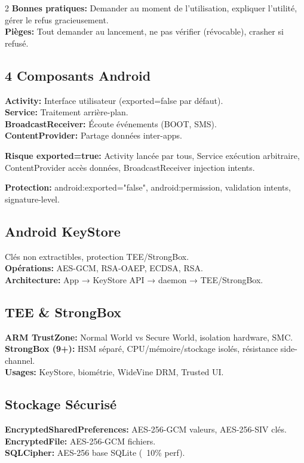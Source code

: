 \documentclass[9pt,a4paper]{extarticle}
\begin{document}
\begin{multicols}{2}
\textbf{Bonnes pratiques:} Demander au moment de l'utilisation, expliquer l'utilité, gérer le refus gracieusement.\\
\textbf{Pièges:} Tout demander au lancement, ne pas vérifier (révocable), crasher si refusé.

\subsection*{4 Composants Android}
\textbf{Activity:} Interface utilisateur (exported=false par défaut).\\
\textbf{Service:} Traitement arrière-plan.\\
\textbf{BroadcastReceiver:} Écoute événements (BOOT, SMS).\\
\textbf{ContentProvider:} Partage données inter-apps.

\textbf{Risque exported=true:} Activity lancée par tous, Service exécution arbitraire, ContentProvider accès données, BroadcastReceiver injection intents.

\textbf{Protection:} android:exported="false", android:permission, validation intents, signature-level.

\subsection*{Android KeyStore}
Clés non extractibles, protection TEE/StrongBox.\\
\textbf{Opérations:} AES-GCM, RSA-OAEP, ECDSA, RSA.\\
\textbf{Architecture:} App → KeyStore API → daemon → TEE/StrongBox.

\subsection*{TEE \& StrongBox}
\textbf{ARM TrustZone:} Normal World vs Secure World, isolation hardware, SMC.\\
\textbf{StrongBox (9+):} HSM séparé, CPU/mémoire/stockage isolés, résistance side-channel.\\
\textbf{Usages:} KeyStore, biométrie, WideVine DRM, Trusted UI.

\subsection*{Stockage Sécurisé}
\textbf{EncryptedSharedPreferences:} AES-256-GCM valeurs, AES-256-SIV clés.\\
\textbf{EncryptedFile:} AES-256-GCM fichiers.\\
\textbf{SQLCipher:} AES-256 base SQLite (~10\% perf).


\end{multicols}
\end{document}

